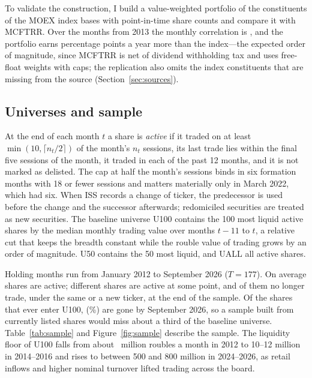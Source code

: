\documentclass[11pt]{article}
\begin{document}
To validate the construction, I build a value-weighted portfolio of the constituents of the MOEX index bases with
point-in-time share counts and compare it with MCFTRR. Over the  months from 2013 the monthly correlation is
, and the portfolio earns  percentage points a year more than the index---the expected
order of magnitude, since MCFTRR is net of dividend withholding tax and uses free-float weights with caps; the
replication also omits the index constituents that are missing from the source (Section~\ref{sec:sources}).

\subsection{Universes and sample}\label{sec:universes}

At the end of each month $t$ a share is \emph{active} if it traded on at least $\min(10,\lceil n_t/2\rceil)$ of the
month's $n_t$ sessions, its last trade lies within the final five sessions of the month, it traded in each of the past
12 months, and it is not marked as delisted. The cap at half the month's sessions binds in six formation months with 18 or
fewer sessions and matters materially only in March 2022, which had six. When ISS records a change of ticker, the predecessor is used before the change and the successor
afterwards; redomiciled securities are treated as new securities. The baseline universe U100 contains the 100 most
liquid active shares by the median monthly trading value over months $t-11$ to $t$, a relative cut that keeps the
breadth constant while the rouble value of trading grows by an order of magnitude. U50 contains the 50 most liquid,
and UALL all active shares.

Holding months run from January 2012 to September 2026 ($T=177$). On average  shares are active;
 different shares are active at some point, and  of them no longer trade, under the same or a
new ticker, at the end of the sample. Of the  shares that ever enter U100, 
(\%) are gone by September 2026, so a sample built from currently listed shares would miss about a
third of the baseline universe.
Table~\ref{tab:sample} and Figure~\ref{fig:sample} describe the sample. The liquidity floor of U100 falls from about
~million roubles a month in 2012 to 10--12 million in 2014--2016 and rises to between 500 and 800 million in
2024--2026, as retail inflows and higher nominal turnover lifted trading across the board.
\end{document}
